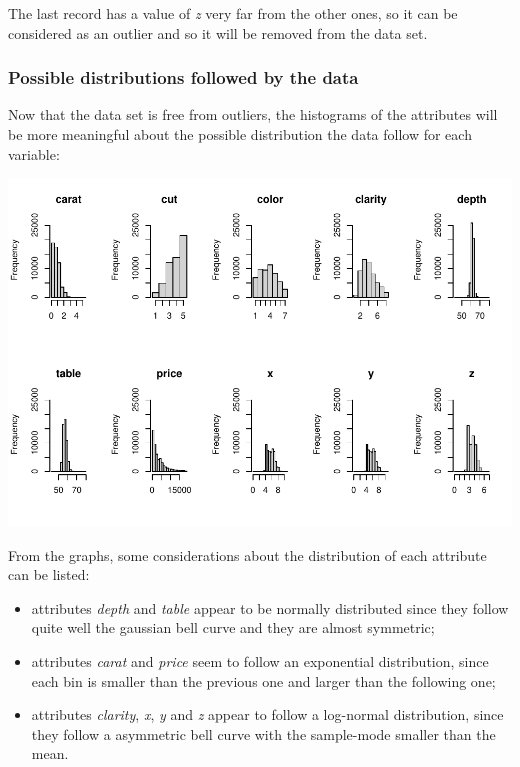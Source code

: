 \documentclass[
]{article}
\providecommand{\tightlist}{%
  \setlength{\itemsep}{0pt}\setlength{\parskip}{0pt}}
\begin{document}
The last record has a value of \emph{z} very far from the other ones, so
it can be considered as an outlier and so it will be removed from the
data set.

\newpage

\subsubsection{Possible distributions followed by the
data}\label{possible-distributions-followed-by-the-data}

Now that the data set is free from outliers, the histograms of the
attributes will be more meaningful about the possible distribution the
data follow for each variable:

\includegraphics{Report_files/figure-latex/unnamed-chunk-8-1.pdf}

From the graphs, some considerations about the distribution of each
attribute can be listed:

\begin{itemize}
\tightlist
\item
  attributes \emph{depth} and \emph{table} appear to be normally
  distributed since they follow quite well the gaussian bell curve and
  they are almost symmetric;
\item
  attributes \emph{carat} and \emph{price} seem to follow an exponential
  distribution, since each bin is smaller than the previous one and
  larger than the following one;
\item
  attributes \emph{clarity}, \emph{x}, \emph{y} and \emph{z} appear to
  follow a log-normal distribution, since they follow a asymmetric bell
  curve with the sample-mode smaller than the mean.
\end{itemize}
\end{document}
